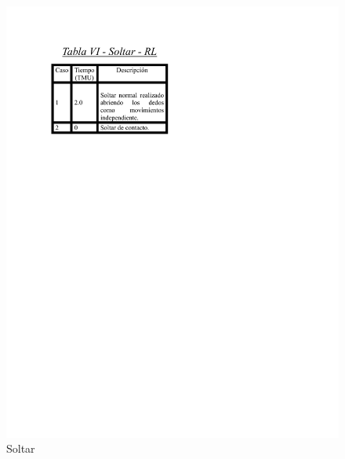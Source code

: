 \begin{figure}[H]
    \centering
    \includegraphics[scale=0.6]{13/img/tablaSoltar.pdf}
    \caption{Soltar}
    \label{fig:Soltar}
\end{figure}
% 
